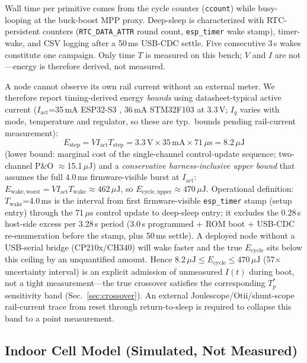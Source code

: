 \documentclass[10pt, conference, letterpaper]{IEEEtran}
\begin{document}
Wall time per primitive comes from the cycle counter (\texttt{ccount}) while busy-looping at the buck-boost MPP proxy. Deep-sleep is characterized with RTC-persistent counters (\texttt{RTC\_DATA\_ATTR} round count, \texttt{esp\_timer} wake stamp), timer-wake, and CSV logging after a 50\,ms USB-CDC settle. Five consecutive 3\,s wakes constitute one campaign. Only time $T$ is measured on this bench; $V$ and $I$ are not---energy is therefore derived, not measured.

A node cannot observe its own rail current without an external meter. We therefore report timing-derived energy \emph{bounds} using datasheet-typical active current ($I_{\mathrm{act}}$=35\,mA ESP32-S3 \cite{espressif_s3_datasheet}, 36\,mA STM32F103 \cite{st_stm32f103} at 3.3\,V; $I_q$ varies with mode, temperature and regulator, so these are typ.~bounds pending rail-current measurement):
\begin{equation}
E_{\mathrm{step}} = V I_{\mathrm{act}} T_{\mathrm{step}} = 3.3\,\mathrm{V}\times35\,\mathrm{mA}\times71\,\mu\mathrm{s}=8.2\,\mu\mathrm{J}
\end{equation}
(lower bound: marginal cost of the single-channel control-update sequence; two-channel P\&O $\approx$15.1\,$\mu$J) and a \emph{conservative harness-inclusive upper bound} that assumes the full 4.0\,ms firmware-visible burst at $I_{\mathrm{act}}$:
$E_{\mathrm{wake,worst}} = V I_{\mathrm{act}} T_{\mathrm{wake}} \approx 462\,\mu\mathrm{J}$, so $E_{\mathrm{cycle,upper}} \approx 470\,\mu\mathrm{J}$. Operational definition: $T_{\mathrm{wake}}$=4.0\,ms is the interval from first firmware-visible \texttt{esp\_timer} stamp (setup entry) through the 71\,$\mu$s control update to deep-sleep entry; it excludes the 0.28\,s host-side excess per 3.28\,s period (3.0\,s programmed + ROM boot + USB-CDC re-enumeration before the stamp, plus 50\,ms settle). A deployed node without a USB-serial bridge (CP210x/CH340) will wake faster and the true $E_{\mathrm{cycle}}$ sits below this ceiling by an unquantified amount. Hence $8.2\,\mu\mathrm{J}\le E_{\mathrm{cycle}}\le 470\,\mu\mathrm{J}$ (57$\times$ uncertainty interval) is an explicit admission of unmeasured $I(t)$ during boot, not a tight measurement---the true crossover satisfies the corresponding $T_p^*$ sensitivity band (Sec.~\ref{sec:crossover}). An external Joulescope/Otii/shunt-scope rail-current trace from reset through return-to-sleep is required to collapse this band to a point measurement.

\subsection{Indoor Cell Model (Simulated, Not Measured)}
\label{sec:scaps}
\end{document}
